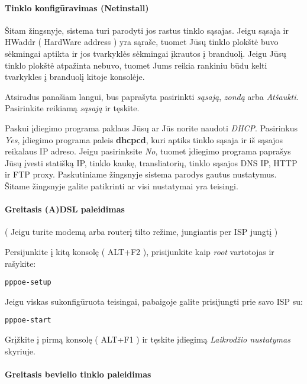   \paragraph{Tinklo konfigūravimas (Netinstall)}

  Šitam žingsnyje, sistema turi parodyti jos rastus tinklo
  sąsajas. Jeigu sąsaja ir HWaddr ( HardWare address ) yra sąraše,
  tuomet Jūsų tinklo plokštė buvo sėkmingai aptikta ir jos tvarkyklės
  sėkmingai įkrautos į branduolį. Jeigu Jūsų tinklo plokštė atpažinta
  nebuvo, tuomet Jums reikia rankiniu būdu kelti tvarkykles į
  branduolį kitoje konsolėje.

  Atsiradus panašiam langui, bus paprašyta pasirinkti \textsl{sąsają},
  \textsl{zondą} arba \textsl{Atšaukti}. Pasirinkite reikiamą
  \textsl{sąsają} ir tęskite.

  Paskui įdiegimo programa paklaus Jūsų ar Jūs norite naudoti
  \textsl{DHCP}. Pasirinkus \textsl{Yes}, įdiegimo programa paleis
  \textbf{dhcpcd}, kuri aptiks tinklo sąsaja ir iš sąsajos reikalaus
  IP adreso. Jeigu pasirinksite \textsl{No}, tuomet įdiegimo programa
  paprašys Jūsų įvesti statišką IP, tinklo kaukę, transliatorių,
  tinklo sąsajos DNS IP, HTTP ir FTP proxy. Paskutiniame žingsnyje
  sistema parodys gautus nustatymus. Šitame žingsnyje galite patikrinti
  ar visi nustatymai yra teisingi.

  \paragraph{Greitasis (A)DSL paleidimas}

  ( Jeigu turite modemą arba routerį tilto režime, jungiantis per ISP
  jungtį )

  Persijunkite į kitą konsolę ( ALT+F2 ), prisijunkite kaip
  \textsl{root} vartotojas ir rašykite:

  \begin{verbatim}
pppoe-setup
  \end{verbatim}

  Jeigu viskas sukonfigūruota teisingai, pabaigoje galite prisijungti
  prie savo ISP su:

  \begin{verbatim}
pppoe-start
  \end{verbatim}

  Grįžkite į pirmą konsolę ( ALT+F1 ) ir tęskite įdiegimą
  \textsl{Laikrodžio nustatymas} skyriuje.

  \paragraph{Greitasis bevielio tinklo paleidimas}

